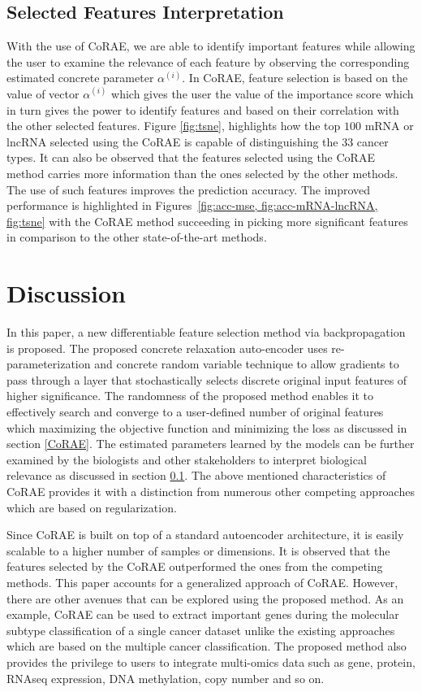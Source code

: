 \documentclass{bioinfo}
\begin{document}
\subsection{Selected Features Interpretation} \label{inter}
With the use of CoRAE, we are able to identify important features while allowing the user to examine the relevance of each feature by observing the corresponding estimated concrete parameter $\alpha^{(i)}$.
In CoRAE, feature selection is based on the value of vector $\alpha^{(i)}$ which gives the user the value of the importance score which in turn gives the power to identify features and based on their correlation with the other selected features. 
Figure \ref{fig:tsne}, highlights how the top $100$ mRNA or lncRNA selected using the CoRAE is capable of distinguishing the $33$ cancer types. 
It can also be observed that the  features selected using the CoRAE method carries more information than the ones selected by the other methods.
The use of such features improves the prediction accuracy.
The improved performance is highlighted in Figures~\ref{fig:acc-mse, fig:acc-mRNA-lncRNA, fig:tsne} with the CoRAE method succeeding in picking more significant features in comparison to the other state-of-the-art methods.

\section{Discussion}
In this paper, a new differentiable feature selection method via backpropagation is proposed.
The proposed concrete relaxation auto-encoder uses re-parameterization and concrete random variable technique to allow gradients to pass through a layer that stochastically selects discrete original input features of higher significance.
The randomness of the proposed method enables it to effectively search and converge to a user-defined number of original features which maximizing the objective function and minimizing the loss as discussed in section \ref{CoRAE}.
The estimated parameters learned by the models can be further examined by the biologists and other stakeholders to interpret biological relevance as discussed in section \ref{inter}.
The above mentioned characteristics of CoRAE provides it with a distinction from numerous other competing approaches which are based on regularization. 

Since CoRAE is built on top of a standard autoencoder architecture, it is easily scalable to a higher number of samples or dimensions.
It is observed that the features selected by the CoRAE outperformed the ones from the competing methods.
This paper accounts for a generalized approach of CoRAE. However, there are other avenues that can be explored using the proposed method.
As an example, CoRAE can be used to extract important genes during the molecular subtype classification of a single cancer dataset unlike the existing approaches which are based on the multiple cancer classification.
The proposed method also provides the privilege to users to integrate multi-omics data such as gene, protein, RNAseq expression, DNA methylation, copy number and so on. 
\end{document}
